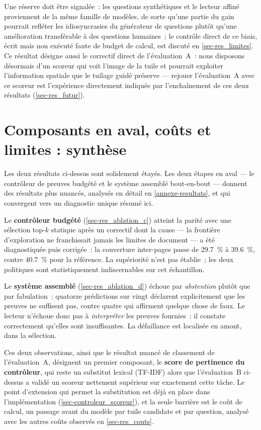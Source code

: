 Une réserve doit être signalée~: les questions synthétiques et le lecteur
affiné proviennent de la même famille de modèles, de sorte qu'une partie du
gain pourrait refléter les idiosyncrasies du générateur de questions plutôt
qu'une amélioration transférable à des questions humaines~; le contrôle direct
de ce biais, écrit mais non exécuté faute de budget de calcul, est discuté en
\cref{sec-res_limites}. Ce résultat désigne aussi le correctif direct de
l'évaluation~A~: nous disposons désormais d'un scoreur qui voit l'image de la
tuile et pourrait exploiter l'information spatiale que le tuilage guidé
préserve --- rejouer l'évaluation~A avec ce scoreur est l'expérience
directement indiquée par l'enchaînement de ces deux résultats
(\cref{sec-res_futur}).

\section{Composants en aval, coûts et limites : synthèse}
\label{sec-res_synthese}

Les deux résultats ci-dessus sont solidement étayés. Les deux étapes en aval
--- le contrôleur de preuves budgété et le système assemblé bout-en-bout ---
donnent des résultats plus nuancés, analysés en détail en
\cref{annexe-resultats}, et qui convergent vers un diagnostic unique résumé
ici.

Le \textbf{contrôleur budgété} (\cref{sec-res_ablation_c}) atteint la parité
avec une sélection top-$k$ statique après un correctif dont la cause --- la
frontière d'exploration ne franchissait jamais les limites de document --- a
été diagnostiquée puis corrigée~: la couverture inter-pages passe de
\SI{29.7}{\percent} à \SI{39.6}{\percent}, contre \SI{40.7}{\percent} pour la
référence. La supériorité n'est pas établie~; les deux politiques sont
statistiquement indiscernables sur cet échantillon.

Le \textbf{système assemblé} (\cref{sec-res_ablation_d}) échoue par
\emph{abstention} plutôt que par fabulation~: quatorze prédictions sur vingt
déclarent explicitement que les preuves ne suffisent pas, contre quatre qui
affirment quelque chose de faux. Le lecteur n'échoue donc pas à
\emph{interpréter} les preuves fournies~: il constate correctement qu'elles
sont insuffisantes. La défaillance est localisée en amont, dans la sélection.

Ces deux observations, ainsi que le résultat nuancé de classement de
l'évaluation~A, désignent un premier composant, le \textbf{score de pertinence
du contrôleur}, qui reste un substitut lexical (TF-IDF) alors que
l'évaluation~B ci-dessus a validé un scoreur nettement supérieur sur
exactement cette tâche. Le point d'extension qui permet la substitution est
déjà en place dans l'implémentation (\cref{sec-controleur_scoreur}), et la
seule barrière est le coût de calcul, un passage avant du modèle par tuile
candidate et par question, analysé avec les autres coûts observés en
\cref{sec-res_couts}.


